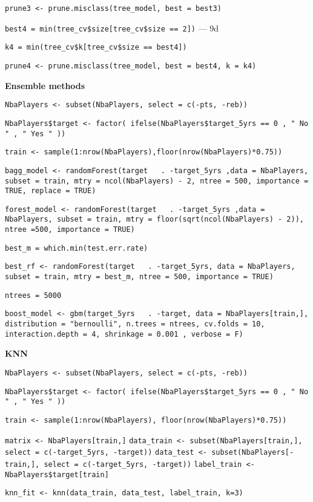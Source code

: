 \texttt{prune3 <- prune.misclass(tree\_model, best = best3)}

\texttt{best4 = min(tree\_cv\$size[tree\_cv\$size == 2])} --- 9d

\texttt{k4 = min(tree\_cv\$k[tree\_cv\$size == best4])}

\texttt{prune4 <- prune.misclass(tree\_model, best = best4, k = k4)}

\noindent
\textbf{Ensemble methods}

\texttt{NbaPlayers <- subset(NbaPlayers, select = c(-pts, -reb))}

\texttt{NbaPlayers\$target <- factor( ifelse(NbaPlayers\$target\_5yrs == 0 , " No " , " Yes " ))}

\texttt{train <- sample(1:nrow(NbaPlayers),floor(nrow(NbaPlayers)*0.75))}

\texttt{bagg\_model <- randomForest(target ~ . -target\_5yrs ,data = NbaPlayers, subset = train,	mtry = ncol(NbaPlayers) - 2, ntree = 500, importance = TRUE, replace = TRUE)}

\texttt{forest\_model <- randomForest(target ~ . -target\_5yrs ,data = NbaPlayers, subset = train,	mtry = floor(sqrt(ncol(NbaPlayers) - 2)), ntree =500, importance = TRUE)}

\texttt{best\_m = which.min(test.err.rate)}

\texttt{best\_rf <- randomForest(target ~ . -target\_5yrs, data = NbaPlayers, subset = train, mtry = best\_m, ntree = 500, importance = TRUE)}

\texttt{ntrees = 5000}

\texttt{boost\_model <- gbm(target\_5yrs ~ . -target, data = NbaPlayers[train,], distribution = "bernoulli", n.trees = ntrees, cv.folds = 10, interaction.depth = 4, shrinkage = 0.001 , verbose = F)}

\noindent
\textbf{KNN}

\texttt{NbaPlayers <- subset(NbaPlayers, select = c(-pts, -reb))}

\texttt{NbaPlayers\$target <- factor( ifelse(NbaPlayers\$target\_5yrs == 0 , " No " , " Yes " ))}

\texttt{train <- sample(1:nrow(NbaPlayers), floor(nrow(NbaPlayers)*0.75))}

\texttt{matrix <- NbaPlayers[train,]}
\texttt{data\_train <- subset(NbaPlayers[train,], select = c(-target\_5yrs, -target))} 
\texttt{data\_test <- subset(NbaPlayers[-train,], select = c(-target\_5yrs, -target))}
\texttt{label\_train <- NbaPlayers\$target[train]}

\texttt{knn\_fit <- knn(data\_train, data\_test, label\_train, k=3)}

